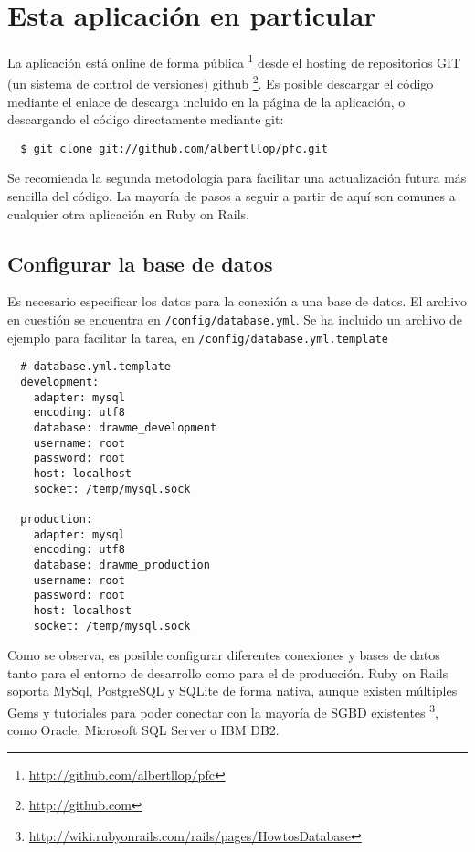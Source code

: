 \section{Esta aplicación en particular} %
\label{sec:esta_aplicacion_en_particular}

La aplicación está online de forma pública \footnote{\url{http://github.com/albertllop/pfc}} desde el hosting de repositorios GIT (un sistema de control de versiones) github \footnote{\url{http://github.com}}. Es posible descargar el código mediante el enlace de descarga incluido en la página de la aplicación, o descargando el código directamente mediante git:

\begin{verbatim}
  $ git clone git://github.com/albertllop/pfc.git
\end{verbatim}

Se recomienda la segunda metodología para facilitar una actualización futura más sencilla del código. La mayoría de pasos a seguir a partir de aquí son comunes a cualquier otra aplicación en Ruby on Rails.

\subsection{Configurar la base de datos} %
\label{sub:configurar_la_base_de_datos}

Es necesario especificar los datos para la conexión a una base de datos. El archivo en cuestión se encuentra en \texttt{/config/database.yml}. Se ha incluido un archivo de ejemplo para facilitar la tarea, en \texttt{/config/database.yml.template}

\begin{verbatim}
  # database.yml.template
  development:
    adapter: mysql
    encoding: utf8
    database: drawme_development
    username: root
    password: root
    host: localhost
    socket: /temp/mysql.sock

  production:
    adapter: mysql
    encoding: utf8
    database: drawme_production
    username: root
    password: root
    host: localhost
    socket: /temp/mysql.sock
\end{verbatim}

Como se observa, es posible configurar diferentes conexiones y bases de datos tanto para el entorno de desarrollo como para el de producción. Ruby on Rails soporta MySql, PostgreSQL y SQLite de forma nativa, aunque existen múltiples Gems y tutoriales para poder conectar con la mayoría de SGBD existentes \footnote{\url{http://wiki.rubyonrails.com/rails/pages/HowtosDatabase}}, como Oracle, Microsoft SQL Server o IBM DB2.

